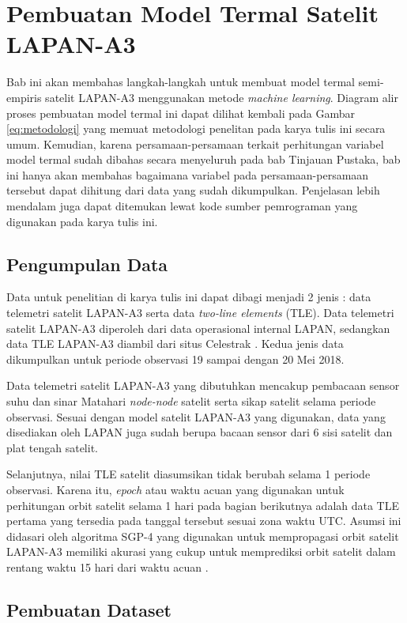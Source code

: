 \chapter{Pembuatan Model Termal Satelit LAPAN-A3}

Bab ini akan membahas langkah-langkah untuk membuat model termal semi-empiris
satelit LAPAN-A3 menggunakan metode \textit{machine learning}. Diagram alir
proses pembuatan model termal ini dapat dilihat kembali pada Gambar
\ref{eq:metodologi} yang memuat metodologi penelitan pada karya tulis ini
secara umum. Kemudian, karena persamaan-persamaan terkait perhitungan variabel
model termal sudah dibahas secara menyeluruh pada bab Tinjauan Pustaka, bab ini
hanya akan membahas bagaimana variabel pada persamaan-persamaan tersebut dapat
dihitung dari data yang sudah dikumpulkan. Penjelasan lebih mendalam juga dapat
ditemukan lewat kode sumber pemrograman yang digunakan pada karya tulis ini.

\section{Pengumpulan Data}

Data untuk penelitian di karya tulis ini dapat dibagi menjadi 2 jenis : data
telemetri satelit LAPAN-A3 serta data \textit{two-line elements} (TLE). Data
telemetri satelit LAPAN-A3 diperoleh dari data operasional internal LAPAN,
sedangkan data TLE LAPAN-A3 diambil dari situs Celestrak \cite{kelso}. Kedua
jenis data dikumpulkan untuk periode observasi 19 sampai dengan 20 Mei 2018.

Data telemetri satelit LAPAN-A3 yang dibutuhkan mencakup pembacaan sensor suhu
dan sinar Matahari \textit{node-node} satelit serta sikap satelit selama
periode observasi. Sesuai dengan model satelit LAPAN-A3 yang digunakan, data
yang disediakan oleh LAPAN juga sudah berupa bacaan sensor dari 6 sisi satelit
dan plat tengah satelit.

Selanjutnya, nilai TLE satelit diasumsikan tidak berubah selama 1 periode
observasi. Karena itu, \textit{epoch} atau waktu acuan yang digunakan untuk
perhitungan orbit satelit selama 1 hari pada bagian berikutnya adalah data TLE
pertama yang tersedia pada tanggal tersebut sesuai zona waktu UTC. Asumsi ini
didasari oleh algoritma SGP-4 yang digunakan untuk mempropagasi orbit satelit
LAPAN-A3 memiliki akurasi yang cukup untuk memprediksi orbit satelit dalam
rentang waktu 15 hari dari waktu acuan \cite{kelsoa}.

\section{Pembuatan Dataset}

